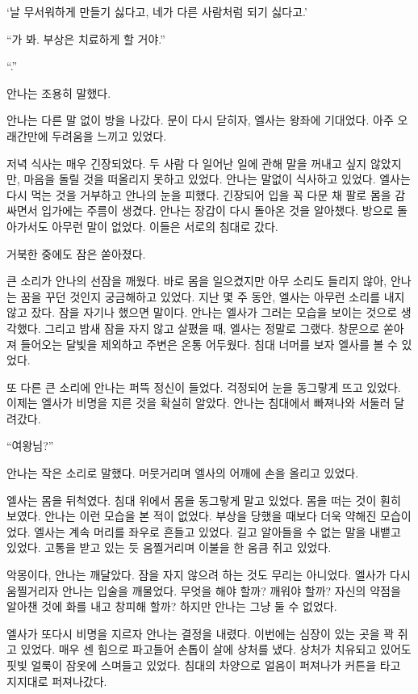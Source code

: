 `날 무서워하게 만들기 싫다고, 네가 다른 사람처럼 되기 싫다고.'

``가 봐. 부상은 치료하게 할 거야.''

``.''

안나는 조용히 말했다.

안나는 다른 말 없이 방을 나갔다. 문이 다시 닫히자, 엘사는 왕좌에 기대었다. 아주 오래간만에 두려움을 느끼고 있었다.

\textbreak

저녁 식사는 매우 긴장되었다. 두 사람 다 일어난 일에 관해 말을 꺼내고 싶지 않았지만, 마음을 돌릴 것을 떠올리지 못하고 있었다. 안나는 말없이 식사하고 있었다. 엘사는 다시 먹는 것을 거부하고 안나의 눈을 피했다. 긴장되어 입을 꼭 다문 채 팔로 몸을 감싸면서 입가에는 주름이 생겼다. 안나는 장갑이 다시 돌아온 것을 알아챘다. 방으로 돌아가서도 아무런 말이 없었다. 이들은 서로의 침대로 갔다.

거북한 중에도 잠은 쏟아졌다.

큰 소리가 안나의 선잠을 깨웠다. 바로 몸을 일으켰지만 아무 소리도 들리지 않아, 안나는 꿈을 꾸던 것인지 궁금해하고 있었다. 지난 몇 주 동안, 엘사는 아무런 소리를 내지 않고 잤다. 잠을 자기나 했으면 말이다. 안나는 엘사가 그러는 모습을 보이는 것으로 생각했다. 그리고 밤새 잠을 자지 않고 살폈을 때, 엘사는 정말로 그랬다. 창문으로 쏟아져 들어오는 달빛을 제외하고 주변은 온통 어두웠다. 침대 너머를 보자 엘사를 볼 수 있었다.

또 다른 큰 소리에 안나는 퍼뜩 정신이 들었다. 걱정되어 눈을 동그랗게 뜨고 있었다. 이제는 엘사가 비명을 지른 것을 확실히 알았다. 안나는 침대에서 빠져나와 서둘러 달려갔다.

``여왕님?''

안나는 작은 소리로 말했다. 머뭇거리며 엘사의 어깨에 손을 올리고 있었다.

엘사는 몸을 뒤척였다. 침대 위에서 몸을 동그랗게 말고 있었다. 몸을 떠는 것이 훤히 보였다. 안나는 이런 모습을 본 적이 없었다. 부상을 당했을 때보다 더욱 약해진 모습이었다. 엘사는 계속 머리를 좌우로 흔들고 있었다. 길고 알아들을 수 없는 말을 내뱉고 있었다. 고통을 받고 있는 듯 움찔거리며 이불을 한 움큼 쥐고 있었다.

악몽이다, 안나는 깨달았다. 잠을 자지 않으려 하는 것도 무리는 아니었다. 엘사가 다시 움찔거리자 안나는 입술을 깨물었다. 무엇을 해야 할까? 깨워야 할까? 자신의 약점을 알아챈 것에 화를 내고 창피해 할까? 하지만 안나는 그냥 둘 수 없었다.

엘사가 또다시 비명을 지르자 안나는 결정을 내렸다. 이번에는 심장이 있는 곳을 꽉 쥐고 있었다. 매우 센 힘으로 파고들어 손톱이 살에 상처를 냈다. 상처가 치유되고 있어도 핏빛 얼룩이 잠옷에 스며들고 있었다. 침대의 차양으로 얼음이 퍼져나가 커튼을 타고 지지대로 퍼져나갔다.

